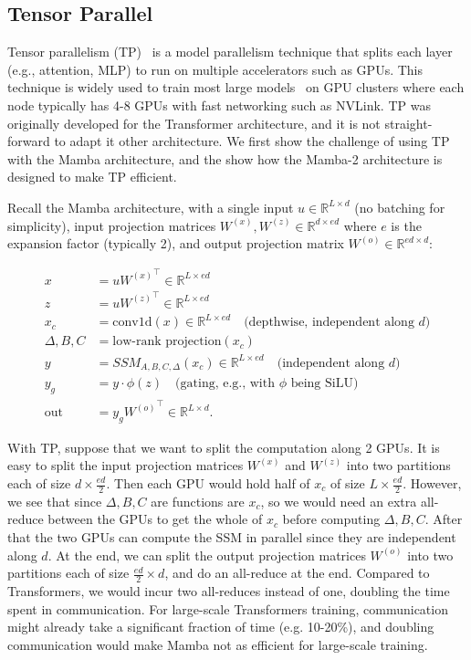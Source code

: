 \subsection{Tensor Parallel}
\label{subsec:tp}

Tensor parallelism (TP)~\citep{shoeybi2019megatron} is a model parallelism technique that splits each layer (e.g., attention, MLP) to run on multiple accelerators such as GPUs. This technique is widely used to train most large models~\citep{brown2020language, chowdhery2022palm, touvron2023llama, touvron2023llama2}  on GPU clusters where each node typically has 4-8 GPUs with fast networking such as NVLink. TP was originally developed for the Transformer architecture, and it is not straight-forward to adapt it other architecture. We first show the challenge of using TP with the Mamba architecture, and the show how the Mamba-2 architecture is designed to make TP efficient.

Recall the Mamba architecture, with a single input $u \in \mathbb{R}^{L \times d}$ (no batching for simplicity), input projection matrices $W^{(x)}, W^{(z)} \in \mathbb{R}^{d \times ed}$ where $e$ is the expansion factor (typically 2), and output projection matrix $W^{(o)} \in \mathbb{R}^{ed \times d}$:

\begin{align*}
   x &= u {W^{(x)}}^\top \in \mathbb{R}^{L \times ed} \\
   z &= u {W^{(z)}}^\top \in \mathbb{R}^{L \times ed} \\
   x_c &= \mathrm{conv1d}(x) \in \mathbb{R}^{L \times ed} \quad \text{(depthwise, independent along $d$)} \\
   \Delta, B, C &= \text{low-rank projection}(x_c) \\
   y &= SSM_{A, B, C, \Delta}(x_c) \in \mathbb{R}^{L \times ed} \quad \text{(independent along $d$)} \\
   y_g &= y \cdot \phi(z)  \quad \text{(gating, e.g., with $\phi$ being SiLU)} \\
  \mathrm{out} &= y_g {W^{(o)}}^\top \in \mathbb{R}^{L \times d}.
\end{align*}

With TP, suppose that we want to split the computation along 2 GPUs. It is easy to split the input projection matrices $W^{(x)}$ and $W^{(z)}$ into two partitions each of size $d \times \frac{ed}{2}$.
Then each GPU would hold half of $x_c$ of size $L \times \frac{ed}{2}$.
However, we see that since $\Delta, B, C$ are functions are $x_c$, so we would need an extra all-reduce between the GPUs to get the whole of $x_c$ before computing $\Delta, B, C$. After that the two GPUs can compute the SSM in parallel since they are independent along $d$. At the end, we can split the output projection matrices $W^{(o)}$ into two partitions each of size $\frac{ed}{2} \times d$, and do an all-reduce at the end. Compared to Transformers, we would incur two all-reduces instead of one, doubling the time spent in communication. For large-scale Transformers training, communication might already take a significant fraction of time (e.g. 10-20\%), and doubling communication would make Mamba not as efficient for large-scale training.

